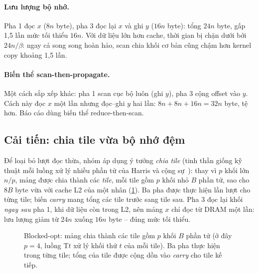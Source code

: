 \paragraph{Lưu lượng bộ nhớ.} Pha 1 đọc \(x\) (\(8n\) byte), pha 3 đọc lại \(x\) và ghi \(y\)
(\(16n\) byte): tổng \(24n\) byte, gấp 1,5 lần mức tối thiểu \(16n\). Với dữ liệu lớn hơn cache,
thời gian bị chặn dưới bởi \(24n/\beta\): ngay cả song song hoàn hảo, scan chia khối cơ bản cũng
chậm hơn kernel copy khoảng 1,5 lần.

\paragraph{Biến thể scan-then-propagate.} Một cách sắp xếp khác: pha 1 scan cục bộ luôn (ghi
\(y\)), pha 3 cộng offset vào \(y\). Cách này đọc \(x\) một lần nhưng đọc--ghi \(y\) hai lần:
\(8n + 8n + 16n = 32n\) byte, tệ hơn. Báo cáo dùng biến thể reduce-then-scan.

\subsection{Cải tiến: chia tile vừa bộ nhớ đệm}
\label{sec:alg-tiled}

Để loại bỏ lượt đọc thừa, nhóm áp dụng ý tưởng \emph{chia tile} (tinh thần giống kỹ thuật mỗi
luồng xử lý nhiều phần tử của Harris và cộng sự~\cite{harris2007}): thay vì \(p\) khối lớn
\(n/p\), mảng được chia thành các \emph{tile}, mỗi tile gồm \(p\) khối nhỏ \(B\) phần tử, sao cho
\(8B\) byte vừa với cache L2 của một nhân (\cref{fig:tiled}). Ba pha được thực hiện lần lượt cho
từng tile; biến \emph{carry} mang tổng các tile trước sang tile sau. Pha 3 đọc lại khối
\emph{ngay sau} pha 1, khi dữ liệu còn trong L2, nên mảng \(x\) chỉ đọc từ DRAM một lần: lưu
lượng giảm từ \(24n\) xuống \(16n\) byte -- đúng mức tối thiểu.

\begin{figure}[H]
\centering
{}
\caption{Blocked-opt: mảng chia thành các tile gồm \(p\) khối \(B\) phần tử (ở đây \(p = 4\),
luồng T\(t\) xử lý khối thứ \(t\) của mỗi tile). Ba pha thực hiện trong từng tile; tổng của tile
được cộng dồn vào \emph{carry} cho tile kế tiếp.}
\label{fig:tiled}
\end{figure}


